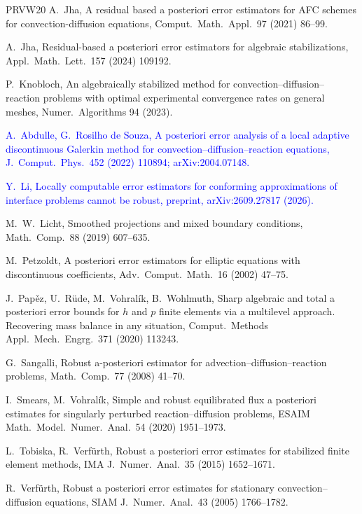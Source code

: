 \documentclass[11pt]{article}
\newcommand{\rev}[1]{\textcolor{blue}{#1}}
\theoremstyle{plain}
\theoremstyle{remark}
\numberwithin{equation}{section}
\begin{document}
\begin{thebibliography}{PRVW20}
A.~Jha,
A residual based a posteriori error estimators for AFC schemes for convection-diffusion equations,
Comput.\ Math.\ Appl.\ 97 (2021) 86--99.

A.~Jha,
Residual-based a posteriori error estimators for algebraic stabilizations,
Appl.\ Math.\ Lett.\ 157 (2024) 109192.

P.~Knobloch,
An algebraically stabilized method for convection--diffusion--reaction problems with optimal
experimental convergence rates on general meshes,
Numer.\ Algorithms 94 (2023).

\rev{A.~Abdulle, G.~Rosilho de Souza,
A posteriori error analysis of a local adaptive discontinuous Galerkin method for
convection--diffusion--reaction equations,
J.\ Comput.\ Phys.\ 452 (2022) 110894; arXiv:2004.07148.}

\rev{Y.~Li,
Locally computable error estimators for conforming approximations of interface problems cannot be
robust, preprint, arXiv:2609.27817 (2026).}

M.~W.~Licht,
Smoothed projections and mixed boundary conditions,
Math.\ Comp.\ 88 (2019) 607--635.

M.~Petzoldt,
A posteriori error estimators for elliptic equations with discontinuous coefficients,
Adv.\ Comput.\ Math.\ 16 (2002) 47--75.

J.~Pap\v{e}z, U.~R\"ude, M.~Vohral\'ik, B.~Wohlmuth,
Sharp algebraic and total a posteriori error bounds for $h$ and $p$ finite elements via a multilevel
approach. Recovering mass balance in any situation,
Comput.\ Methods Appl.\ Mech.\ Engrg.\ 371 (2020) 113243.

G.~Sangalli,
Robust a-posteriori estimator for advection--diffusion--reaction problems,
Math.\ Comp.\ 77 (2008) 41--70.

I.~Smears, M.~Vohral\'ik,
Simple and robust equilibrated flux a posteriori estimates for singularly perturbed
reaction--diffusion problems,
ESAIM Math.\ Model.\ Numer.\ Anal.\ 54 (2020) 1951--1973.

L.~Tobiska, R.~Verfürth,
Robust a posteriori error estimates for stabilized finite element methods,
IMA J.\ Numer.\ Anal.\ 35 (2015) 1652--1671.

R.~Verfürth,
Robust a posteriori error estimates for stationary convection--diffusion equations,
SIAM J.\ Numer.\ Anal.\ 43 (2005) 1766--1782.

\end{thebibliography}
\end{document}
